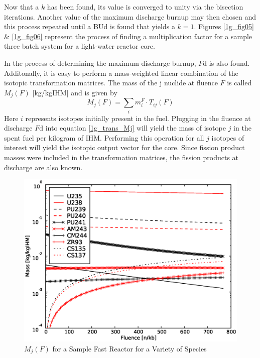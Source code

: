 Now that a $k$ has been found, its value is converged to unity via the bisection iterations.  Another 
value of the maximum discharge burnup may then chosen and this process repeated until a BUd is found 
that yields a $k = 1$.  Figures \ref{1g_fig05} \& \ref{1g_fig06} represent the process of finding a 
multiplication factor for a sample three batch system for a light-water reactor core.  

In the process of determining the maximum discharge burnup, $F\mbox{d}$ is also found.  Additonally, it is  
easy to perform a mass-weighted linear combination of the isotopic transformation matrices. 
The mass of the j 
nuclide at fluence $F$ is called $M_j(F)$ [kg/kgIHM] and is given by
\begin{equation}
\label{1g_trans_Mj}
M_j(F) = \sum_i m_i^F \cdot T_{ij}(F)
\end{equation}
Here $i$ represents isotopes initially present in the fuel.  Plugging in the fluence at discharge 
$F\mbox{d}$ into equation \ref{1g_trans_Mj} will yield the mass of isotope $j$ in the spent fuel per 
kilogram of IHM.  Performing this operation for all $j$ isotopes of interest will yield the isotopic 
output vector for the core.  Since fission product masses were included in the transformation matrices, 
the fission products at discharge are also known.  

\begin{figure}[htbp]
\caption{$M_j(F)$ for a Sample Fast Reactor for a Variety of Species}
\label{1g_fig07}
\begin{center}
\includegraphics[scale=0.5]{one_group_method/figs/Fig07.eps}
\end{center}
\end{figure}

